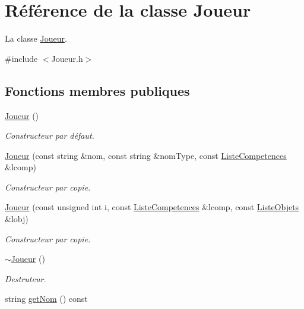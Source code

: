 \hypertarget{classJoueur}{}\section{Référence de la classe Joueur}
\label{classJoueur}


La classe \mbox{\hyperlink{classJoueur}{Joueur}}.  




{\ttfamily \#include $<$Joueur.\+h$>$}

\subsection*{Fonctions membres publiques}
\begin{DoxyCompactItemize}
\item 
\mbox{\hyperlink{classJoueur_add6c98be3020651d84f6d75ccc1d867e}{Joueur}} ()
\begin{DoxyCompactList}\small\item\em Constructeur par défaut. \end{DoxyCompactList}\item 
\mbox{\hyperlink{classJoueur_a95c3bd5643ff4532f35e13ea9250c91e}{Joueur}} (const string \&nom, const string \&nom\+Type, const \mbox{\hyperlink{structListeCompetences}{Liste\+Competences}} \&lcomp)
\begin{DoxyCompactList}\small\item\em Constructeur par copie. \end{DoxyCompactList}\item 
\mbox{\hyperlink{classJoueur_ac409bdc2fab0062af127be02d44f1e69}{Joueur}} (const unsigned int i, const \mbox{\hyperlink{structListeCompetences}{Liste\+Competences}} \&lcomp, const \mbox{\hyperlink{structListeObjets}{Liste\+Objets}} \&lobj)
\begin{DoxyCompactList}\small\item\em Constructeur par copie. \end{DoxyCompactList}\item 
\mbox{\label{classJoueur_a9fb594f755601ee77ce5884c4c0861f3}} 
\mbox{\hyperlink{classJoueur_a9fb594f755601ee77ce5884c4c0861f3}{$\sim$\+Joueur}} ()
\begin{DoxyCompactList}\small\item\em Destruteur. \end{DoxyCompactList}\item 
string \mbox{\hyperlink{classJoueur_aa2ff1bfeeb5e1f631750d70c06b8c6d0}{get\+Nom}} () const

\end{DoxyCompactItemize}
